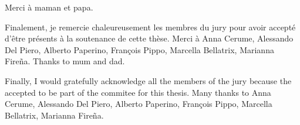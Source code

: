 \documentclass[draft]{phd}
\begin{document}
	\remerciements
			Merci à maman et papa.

			Finalement, je remercie chaleureusement les membres du jury pour avoir accepté d'être présents à la soutenance de cette thèse. 
			Merci à Anna Cerume, Alessando Del Piero, Alberto Paperino, François Pippo, Marcella Bellatrix, Marianna Fireña.
	\acknowledgements
			Thanks to mum and dad.

			Finally, I would gratefully acknowledge all the members of the jury because the accepted to be part of the commitee for this thesis. 
			Many thanks to Anna Cerume, Alessando Del Piero, Alberto Paperino, François Pippo, Marcella Bellatrix, Marianna Fireña.
\end{document}
